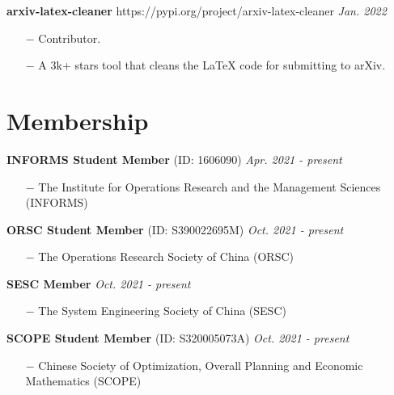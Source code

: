 \documentclass[margin]{res}
\begin{document}
\begin{resume}
\textbf{arxiv-latex-cleaner } https://pypi.org/project/arxiv-latex-cleaner \hfill {\it Jan. 2022}
\begin{itemize} \itemsep -2pt
\item[\(-\)] Contributor.
\item[\(-\)] A 3k+ stars tool that cleans the LaTeX code for submitting to arXiv.
\end{itemize}


\vspace{-.8em}
\section{\sc Membership}


\textbf{INFORMS Student Member} (ID: 1606090) \hfill {\it Apr. 2021 - present}
\begin{itemize}  \itemsep -2pt
\item[\(-\)] The Institute for Operations Research and the Management Sciences (INFORMS)
\end{itemize} 
\vspace{-.8em}

\textbf{ORSC Student Member} (ID: S390022695M) \hfill {\it Oct. 2021 - present}
\begin{itemize}  \itemsep -2pt
\item[\(-\)] The Operations Research Society of China (ORSC)
\end{itemize}
\vspace{-.8em}

\textbf{SESC Member} \hfill {\it Oct. 2021 - present}
\begin{itemize}  \itemsep -2pt
\item[\(-\)] The System Engineering Society of China (SESC)
\end{itemize}
\vspace{-.8em}

\textbf{SCOPE  Student Member} (ID: S320005073A) \hfill {\it Oct. 2021 - present}
\begin{itemize}  \itemsep -2pt
\item[\(-\)] Chinese Society of Optimization, Overall Planning and Economic Mathematics (SCOPE)
\end{itemize}



\end{resume} 
\end{document}
